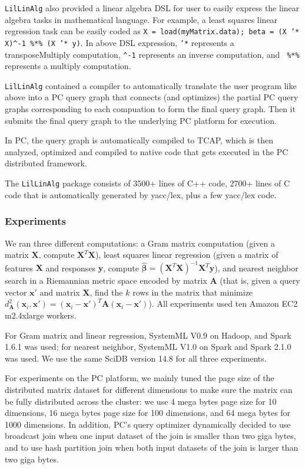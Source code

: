 \texttt{LilLinAlg} also provided a linear algebra DSL for user to
easily express the linear algebra tasks in mathematical language. For
example, a least squares linear regression task can be easily coded as
\texttt{X = load(myMatrix.data); beta = (X '* X)\^{}-1 \%*\% (X '*
  y)}. 
In above DSL expression, \texttt{'*} represents a transposeMultiply computation,
\texttt{\^{}-1} represents an inverse computation, and \texttt{ \%*\%}
represents a multiply computation. 

\texttt{LilLinAlg} contained a compiler
to automatically translate the user program like above into a PC query graph that
connects (and optimizes) the partial PC query graphs corresponding to
each compuation to form the final query graph. Then it submits the
final query graph to the underlying PC platform for execution. 

In PC, the query
graph is automatically compiled to TCAP, which is then analyzed, optimized and compiled to native
code that gets executed in the PC distributed framework.

The \texttt{LilLinAlg} package consists of 3500+ lines of C++ code,
2700+ lines of C code that is automatically generated by yacc/lex, 
plus a few yacc/lex code.

\subsubsection {Experiments}

We ran three different computations:
a Gram matrix computation (given a matrix $\textbf{X}$, compute
$\textbf{X}^T \textbf{X}$), least squares linear regression (given a matrix of features $\textbf{X}$ and
responses $\textbf{y}$, compute 
$\hat{\pmb{\beta}} = (\textbf{X}^{T} \textbf{X})^{-1} \textbf{X}^{T} \textbf{y}$), and nearest
neighbor search in a Riemannian metric space \cite{lebanon2006metric} encoded by matrix $\textbf{A}$ (that is,
given a query vector
$\textbf{x}'$ and matrix $\textbf{X}$, find the $k$ rows in the matrix that minimize 
$d_{\textbf{A}}^2(\textbf{x}_i, \textbf{x}') = 
(\textbf{x}_i - \textbf{x}')^T\textbf{A}(\textbf{x}_i - \textbf{x}')$).  All experiments used
ten Amazon
EC2 m2.4xlarge workers.  

For Gram matrix and linear regression, SystemML V0.9 on Hadoop,
and Spark 1.6.1 was used; for
nearest neighbor, SystemML V1.0 on Spark and Spark 2.1.0 was used. We
use the same SciDB version 14.8 for all three
experiments.

For experiments on the PC platform, we mainly tuned the page size of the
distributed matrix dataset for different dimensions to make sure the
matrix can be fully distributed across the cluster:
we use 4 mega bytes page size for 10 dimensions, 16 mega bytes page
size for 100 dimensions, and 64 mega bytes for 1000 dimensions. In addition, PC's query optimizer dynamically decided to use
broadcast join when one input dataset of the join is smaller than two
giga bytes, and to use hash partition join when both input datasets of
the join is larger than two giga bytes.

